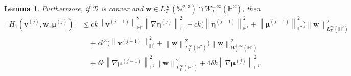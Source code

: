 \documentclass[10pt,a4paper]{amsart}
\newtheorem{lemma}{Lemma}
\newcommand{\bb}{\mathbb}
\newcommand{\bff}{\boldsymbol}
\newcommand{\nn}{\nonumber}
\newcommand{\norm}[2]{\left\|{#1}\right\|_{#2}}
\begin{document}
\begin{lemma}
    Furthermore, if $\mathscr{D}$ is \emph{convex} and $\bff{w}\in L^\infty_T(\bb{W}^{2,3})\cap W^{1,\infty}_T(\bb{H}^2)$, then
    \begin{align}\label{equ:H1 new}
	\big| H_1(\bff{v}^{(j)},\bff{w},\bff{\mu}^{(j)}) \big|
	&\le
	ck\norm{\bff{v}^{(j-1)}}{\bb{H}^1}^2
	\norm{\nabla\bff{\eta}^{(j)}}{\bb{L}^3}^2
	+
	ck
	\Big(\norm{\bff{\eta}^{(j-1)}}{\bb{H}^1}^2
	+ \norm{\bff{\mu}^{(j-1)}}{\bb{L}^2}^2 \Big)
	\norm{\bff{w}}{L^\infty_T(\bb{H}^2)}^2
	\nn\\
	&\quad
	+
	c k^3
	\Big(
	\norm{\bff{v}^{(j-1)}}{\bb{H}^1}^2
	+
	\norm{\bff{w}}{L^\infty_T(\bb{H}^2)}^2
	\Big)  	\norm{\bff{w}}{W^{1,\infty}_T(\bb{H}^2)}^2
	\nn\\
	&\quad
	+ \delta k \norm{\nabla\bff{\mu}^{(j-1)}}{\bb{L}^2}^2 \norm{\bff{w}}{L^\infty_T(\bb{H}^2)}^2
	+ 4 \delta k \norm{\nabla\bff{\mu}^{(j)}}{\bb{L}^2}^2.
    \end{align}
\end{lemma}
\end{document}

